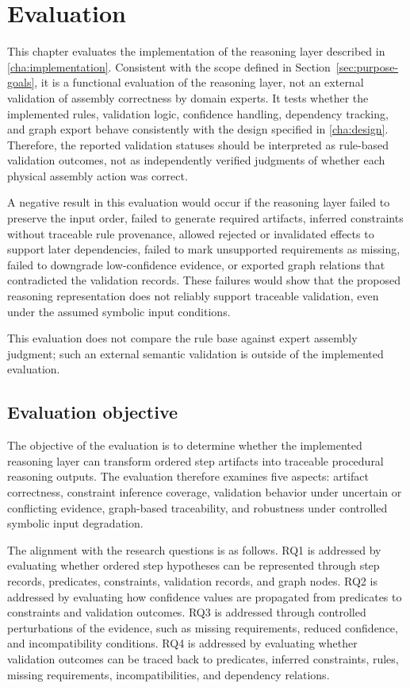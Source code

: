
\chapter{Evaluation}
\label{cha:evaluation}

This chapter evaluates the implementation of the reasoning layer described in \cref{cha:implementation}. Consistent with the scope defined in Section~\ref{sec:purpose-goals}, it is a functional evaluation of the reasoning layer, not an external validation of assembly correctness by domain experts. It tests whether the implemented rules, validation logic, confidence handling, dependency tracking, and graph export behave consistently with the design specified in \cref{cha:design}. Therefore, the reported validation statuses should be interpreted as rule-based validation outcomes, not as independently verified judgments of whether each physical assembly action was correct.

A negative result in this evaluation would occur if the reasoning layer failed to preserve the input order, failed to generate required artifacts, inferred constraints without traceable rule provenance, allowed rejected or invalidated effects to support later dependencies, failed to mark unsupported requirements as missing, failed to downgrade low-confidence evidence, or exported graph relations that contradicted the validation records. These failures would show that the proposed reasoning representation does not reliably support traceable validation, even under the assumed symbolic input conditions.

This evaluation does not compare the rule base against expert assembly judgment; such an external semantic validation is outside of the implemented evaluation.


\section{Evaluation objective}
\label{sec:evaluation-objective}

The objective of the evaluation is to determine whether the implemented reasoning
layer can transform ordered step artifacts into traceable procedural reasoning
outputs. The evaluation therefore examines five aspects: artifact correctness,
constraint inference coverage, validation behavior under uncertain or conflicting
evidence, graph-based traceability, and robustness under controlled symbolic
input degradation.

The alignment with the research questions is as follows. RQ1 is addressed by evaluating whether ordered step hypotheses can be represented through step records, predicates, constraints, validation records, and graph nodes. RQ2 is addressed by evaluating how confidence values are propagated from predicates to constraints and validation outcomes. RQ3 is addressed through controlled perturbations of the evidence, such as missing requirements, reduced confidence, and incompatibility conditions. RQ4 is addressed by evaluating whether validation outcomes can be traced back to predicates, inferred constraints, rules, missing requirements, incompatibilities, and dependency relations.

